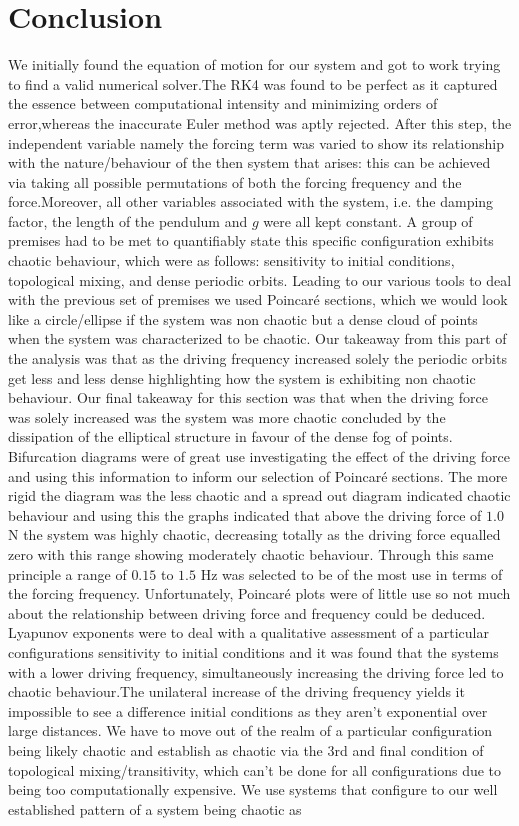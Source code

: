 \documentclass[11pt]{article} %
\begin{document}
\section{Conclusion}
We initially found the equation of motion for our system and got to work trying to find a valid numerical solver.The RK4 was found to be perfect as it captured the essence between computational intensity and minimizing orders of error,whereas the inaccurate Euler method was aptly rejected. After this step, the independent variable namely the forcing term was varied  to show its relationship with the nature/behaviour of the then system that arises: this can be achieved via taking all possible permutations of both the forcing frequency and the force.Moreover, all other variables associated with the system, i.e. the damping factor, the length of the pendulum and $g$ were all kept constant. A group of premises had to be met to quantifiably state this specific configuration exhibits chaotic behaviour, which were as follows: sensitivity to initial conditions, topological mixing, and dense periodic orbits. Leading to our various tools to deal with the previous set of premises we used Poincar\'e sections, which we would look like a circle/ellipse if the system was non chaotic but a dense cloud of points when the system was characterized to be chaotic. Our takeaway from this part of the analysis was that as the driving frequency increased solely the periodic orbits get less and less dense highlighting how the system is exhibiting non chaotic behaviour. Our final takeaway for this section was that when the driving force was solely increased was the system was more chaotic concluded by the dissipation of the elliptical structure in favour of the dense fog of points. Bifurcation diagrams were of great use investigating the effect of the driving force  and using this information to inform our selection of Poincar\'e sections. The more rigid the diagram was the less chaotic and a spread out diagram indicated chaotic behaviour and using this the graphs indicated that above the driving force of $1.0$ N the system was highly chaotic, decreasing totally as the driving force equalled zero with this range showing moderately chaotic behaviour. Through this same principle a range of $0.15$ to $1.5$ Hz was selected to be of the most use in terms of the forcing frequency. Unfortunately, Poincar\'e plots were of little use so not much about the relationship between driving force and frequency could be deduced. Lyapunov exponents were to deal with a qualitative assessment of a particular configurations sensitivity to initial conditions and it was found that the systems with a lower driving frequency, simultaneously increasing the driving force led to chaotic behaviour.The unilateral increase of the driving frequency yields it impossible to see a difference initial conditions as they aren't exponential over large distances. We have to move out of the realm of a particular configuration being likely chaotic and establish as chaotic via the 3rd and final condition of topological mixing/transitivity, which can't be done for all configurations due to being too computationally expensive. We use systems that configure to our well established pattern of a system being chaotic as 
\end{document}
